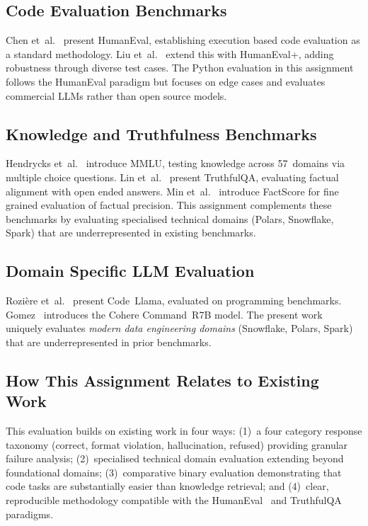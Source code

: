 \documentclass[12pt,a4paper]{article}
\begin{document}
\subsection{Code Evaluation Benchmarks}

Chen et~al.~\cite{chen2021evaluating} present HumanEval, establishing execution based code evaluation as a standard methodology. Liu et~al.~\cite{liu2023humaneval} extend this with HumanEval+, adding robustness through diverse test cases. The Python evaluation in this assignment follows the HumanEval paradigm but focuses on edge cases and evaluates commercial LLMs rather than open source models.

\subsection{Knowledge and Truthfulness Benchmarks}

Hendrycks et~al.~\cite{hendrycks2020measuring} introduce MMLU, testing knowledge across 57~domains via multiple choice questions. Lin et~al.~\cite{lin2022truthfulqa} present TruthfulQA, evaluating factual alignment with open ended answers. Min et~al.~\cite{min2023factscore} introduce FactScore for fine grained evaluation of factual precision. This assignment complements these benchmarks by evaluating specialised technical domains (Polars, Snowflake, Spark) that are underrepresented in existing benchmarks.

\subsection{Domain Specific LLM Evaluation}

Rozi\`{e}re et~al.~\cite{roziere2023code} present Code~Llama, evaluated on programming benchmarks. Gomez~\cite{gomez2024commandr7b} introduces the Cohere Command~R7B model. The present work uniquely evaluates \emph{modern data engineering domains} (Snowflake, Polars, Spark) that are underrepresented in prior benchmarks.

\subsection{How This Assignment Relates to Existing Work}

This evaluation builds on existing work in four ways: (1)~a four category response taxonomy (correct, format violation, hallucination, refused) providing granular failure analysis; (2)~specialised technical domain evaluation extending beyond foundational domains; (3)~comparative binary evaluation demonstrating that code tasks are substantially easier than knowledge retrieval; and (4)~clear, reproducible methodology compatible with the HumanEval~\cite{chen2021evaluating} and TruthfulQA~\cite{lin2022truthfulqa} paradigms.
\end{document}
